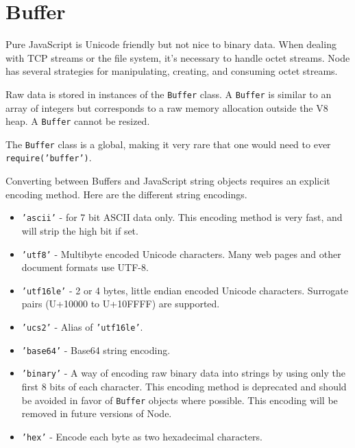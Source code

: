\section{Buffer}

\begin{Shaded}
\begin{Highlighting}[]
\NormalTok{: } 
\end{Highlighting}
\end{Shaded}

Pure JavaScript is Unicode friendly but not nice to binary data. When
dealing with TCP streams or the file system, it's necessary to handle
octet streams. Node has several strategies for manipulating, creating,
and consuming octet streams.

Raw data is stored in instances of the \texttt{Buffer} class. A
\texttt{Buffer} is similar to an array of integers but corresponds to a
raw memory allocation outside the V8 heap. A \texttt{Buffer} cannot be
resized.

The \texttt{Buffer} class is a global, making it very rare that one
would need to ever \texttt{require('buffer')}.

Converting between Buffers and JavaScript string objects requires an
explicit encoding method. Here are the different string encodings.

\begin{itemize}
\item
  \texttt{'ascii'} - for 7 bit ASCII data only. This encoding method is
  very fast, and will strip the high bit if set.
\item
  \texttt{'utf8'} - Multibyte encoded Unicode characters. Many web pages
  and other document formats use UTF-8.
\item
  \texttt{'utf16le'} - 2 or 4 bytes, little endian encoded Unicode
  characters. Surrogate pairs (U+10000 to U+10FFFF) are supported.
\item
  \texttt{'ucs2'} - Alias of \texttt{'utf16le'}.
\item
  \texttt{'base64'} - Base64 string encoding.
\item
  \texttt{'binary'} - A way of encoding raw binary data into strings by
  using only the first 8 bits of each character. This encoding method is
  deprecated and should be avoided in favor of \texttt{Buffer} objects
  where possible. This encoding will be removed in future versions of
  Node.
\item
  \texttt{'hex'} - Encode each byte as two hexadecimal characters.
\end{itemize}

